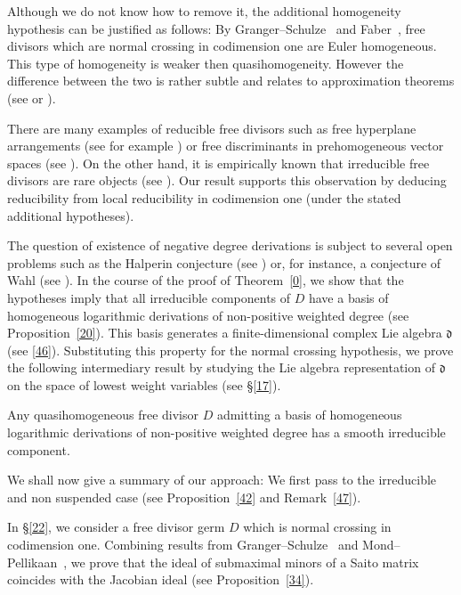 Although we do not know how to remove it, the additional homogeneity hypothesis can be justified as follows:
By Granger--Schulze~\cite[Thm.~1.1]{GS11} and Faber~\cite[Rmk.~54]{Fab12}, free divisors which are normal crossing in codimension one are Euler homogeneous.
This type of homogeneity is weaker then quasihomogeneity.
However the difference between the two is rather subtle and relates to approximation theorems (see \cite{Sai71} or \cite[\S3, Thm.~4]{HM89}).

There are many examples of reducible free divisors such as free hyperplane arrangements (see for example \cite[\S4]{OT92}) or free discriminants in prehomogeneous vector spaces (see \cite{GMS11}).
On the other hand, it is empirically known that irreducible free divisors are rare objects (see \cite{ST12}).
Our result supports this observation by deducing reducibility from local reducibility in codimension one (under the stated additional hypotheses).

The question of existence of negative degree derivations is subject to several open problems such as the Halperin conjecture (see \cite{Hau02}) or, for instance, a conjecture of Wahl (see \cite[Conj.~1.4]{Wah83}).
In the course of the proof of Theorem~\ref{0}, we show that the hypotheses imply that all irreducible components of $D$ have a basis of homogeneous logarithmic derivations of non-positive weighted degree (see Proposition~\ref{20}).
This basis generates a finite-dimensional complex Lie algebra ${\mathfrak{d}}$ (see \eqref{46}).
Substituting this property for the normal crossing hypothesis, we prove the following intermediary result by studying the Lie algebra representation of ${\mathfrak{d}}$ on the space of lowest weight variables (see \S\ref{17}).

\begin{thm}\label{50}
Any quasihomogeneous free divisor $D$ admitting a basis of homogeneous logarithmic derivations of non-positive weighted degree has a smooth irreducible component.
\end{thm}

We shall now give a summary of our approach:
We first pass to the irreducible and non suspended case (see Proposition~\ref{42} and Remark~\ref{47}).

In \S\ref{22}, we consider a free divisor germ $D$ which is normal crossing in codimension one.
Combining results from Granger--Schulze~\cite{GS11} and Mond--Pellikaan~\cite{MP89}, we prove that the ideal of submaximal minors of a Saito matrix coincides with the Jacobian ideal (see Proposition~\ref{34}).

